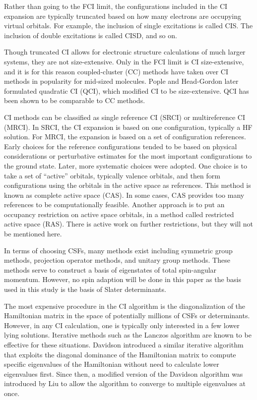 \documentclass[final,3p,times,twocolumn]{elsarticle}
\begin{document}
Rather than going to the FCI limit, the configurations included in the CI expansion are typically truncated based on how many electrons are occupying virtual orbitals. For example, the inclusion of single excitations is called CIS. The inclusion of double excitations is called CISD, and so on.\cite{szabo}  

Though truncated CI allows for electronic structure calculations of much larger systems, they are not size-extensive. Only in the FCI limit is CI size-extensive, and it is for this reason coupled-cluster (CC) methods have taken over CI methods in popularity for mid-sized molecules.\cite{cc,bartlett-2007} Pople and Head-Gordon later formulated quadratic CI (QCI), which modified CI to be size-extensive.\cite{qci} QCI has been shown to be comparable to CC methods.\cite{werner-1992}

CI methods can be classified as single reference CI (SRCI) or multireference CI (MRCI). In SRCI, the CI expansion is based on one configuration, typically a HF solution. For MRCI, the expansion is based on a set of configuration references.\cite{hackmeyer-1969} Early choices for the reference configurations tended to be based on physical considerations\cite{shavitt-1974} or perturbative estimates for the most important configurations to the ground state.\cite{nesbet-1955} Later, more systematic choices were adopted. One choice is to take a set of ``active'' orbitals, typically valence orbitals, and then form configurations using the orbitals in the active space as references.\cite{cas} This method is known as complete active space (CAS). In some cases, CAS provides too many references to be computationally feasible. Another approach is to put an occupancy restriction on active space orbitals, in a method called restricted active space (RAS).\cite{ras} There is active work on further restrictions,\cite{shavitt} but they will not be mentioned here.

In terms of choosing CSFs, many methods exist including symmetric group methods,\cite{wigner} projection operator methods,\cite{lowdin} and unitary group methods.\cite{paldus-1974} These methods serve to construct a basis of eigenstates of total spin-angular momentum. However, no spin adaption will be done in this paper as the basis used in this study is the basis of Slater determinants. %

The most expensive procedure in the CI algorithm is the diagonalization of the Hamiltonian matrix in the space of potentially millions of CSFs or determinants. However, in any CI calculation, one is typically only interested in a few lower lying solutions. Iterative methods such as the Lanczos algorithm are known to be effective for these situations.\cite{Lanczos} Davidson introduced a similar iterative algorithm that exploits the diagonal dominance of the Hamiltonian matrix to compute specific eigenvalues of the Hamiltonian without need to calculate lower eigenvalues first.\cite{davidson} Since then, a modified version of the Davidson algorithm was introduced by Liu to allow the algorithm to converge to multiple eigenvalues at once.\cite{liu}
\end{document}
